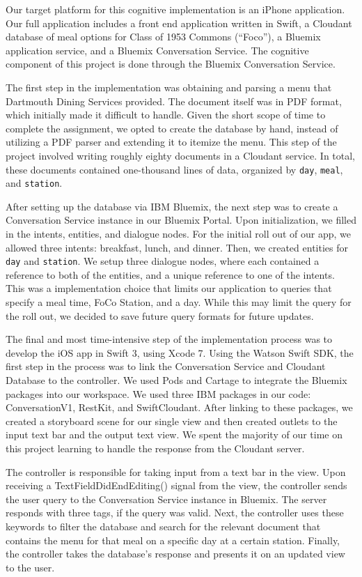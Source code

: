 \documentclass [12pt] {article}
\begin{document}
Our target platform for this cognitive implementation is an iPhone application. Our full application includes a front end application written in Swift, a Cloudant database of meal options for Class of 1953 Commons (``Foco''), a Bluemix application service, and a Bluemix Conversation Service. The cognitive component of this project is done through the Bluemix Conversation Service.

The first step in the implementation was obtaining and parsing a menu that Dartmouth Dining Services provided. The document itself was in PDF format, which initially made it difficult to handle. Given the short scope of time to complete the assignment, we opted to create the database by hand, instead of utilizing a PDF parser and extending it to itemize the menu. This step of the project involved writing roughly eighty documents in a Cloudant service. In total, these documents contained one-thousand lines of data, organized by \verb`day`, \verb`meal`, and \verb`station`.

After setting up the database via IBM Bluemix, the next step was to create a Conversation Service instance in our Bluemix Portal. Upon initialization, we filled in the intents, entities, and dialogue nodes. For the initial roll out of our app, we allowed three intents: breakfast, lunch, and dinner. Then, we created entities for \verb`day` and \verb`station`. We setup three dialogue nodes, where each contained a reference to both of the entities, and a unique reference to one of the intents. This was a implementation choice that limits our application to queries that specify a meal time, FoCo Station, and a day. While this may limit the query for the roll out, we decided to save future query formats for future updates.

The final and most time-intensive step of the implementation process was to develop the iOS app in Swift 3, using Xcode 7. Using the Watson Swift SDK, the first step in the process was to link the Conversation Service and Cloudant Database to the controller. We used Pods and Cartage to integrate the Bluemix packages into our workspace. We used three IBM packages in our code: ConversationV1, RestKit, and SwiftCloudant. After linking to these packages, we created a storyboard scene for our single view and then created outlets to the input text bar and the output text view. We spent the majority of our time on this project learning to handle the response from the Cloudant server.


 The controller is responsible for taking input from a text bar in the view. Upon receiving a TextFieldDidEndEditing() signal from the view, the controller sends the user query to the Conversation Service instance in Bluemix. The server responds with three tags, if the query was valid. Next, the controller uses these keywords to filter the database and search for the relevant document that contains the menu for that meal on a specific day at a certain station. Finally, the controller takes the database's response and presents it on an updated view to the user.
\end{document}
